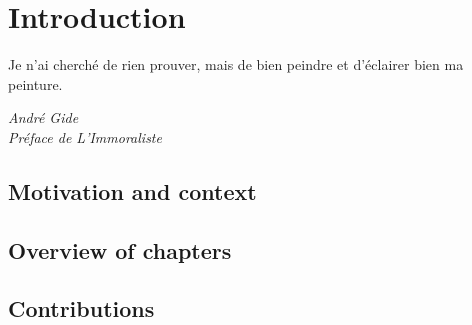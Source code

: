 \chapter[Introduction]{Introduction}

\epigraph{Je n’ai cherché de rien prouver, mais de bien peindre et d’éclairer bien ma peinture.}{\textit{André Gide \\ Préface de L'Immoraliste}}
\minitoc

\section{Motivation and context}


\section{Overview of chapters}


\section{Contributions}